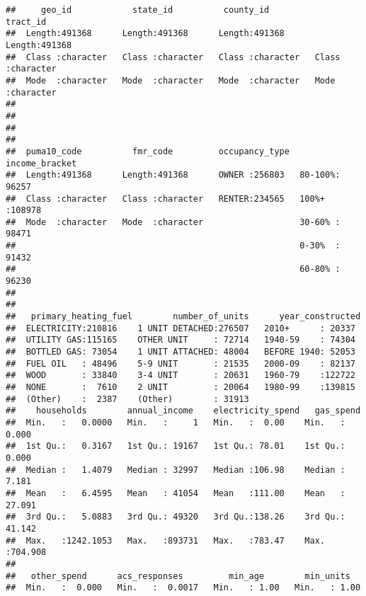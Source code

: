 \documentclass[]{article}
\begin{document}
\begin{verbatim}
##     geo_id            state_id          county_id           tract_id        
##  Length:491368      Length:491368      Length:491368      Length:491368     
##  Class :character   Class :character   Class :character   Class :character  
##  Mode  :character   Mode  :character   Mode  :character   Mode  :character  
##                                                                             
##                                                                             
##                                                                             
##                                                                             
##  puma10_code          fmr_code         occupancy_type  income_bracket  
##  Length:491368      Length:491368      OWNER :256803   80-100%: 96257  
##  Class :character   Class :character   RENTER:234565   100%+  :108978  
##  Mode  :character   Mode  :character                   30-60% : 98471  
##                                                        0-30%  : 91432  
##                                                        60-80% : 96230  
##                                                                        
##                                                                        
##   primary_heating_fuel        number_of_units      year_constructed 
##  ELECTRICITY:210816    1 UNIT DETACHED:276507   2010+      : 20337  
##  UTILITY GAS:115165    OTHER UNIT     : 72714   1940-59    : 74304  
##  BOTTLED GAS: 73054    1 UNIT ATTACHED: 48004   BEFORE 1940: 52053  
##  FUEL OIL   : 48496    5-9 UNIT       : 21535   2000-09    : 82137  
##  WOOD       : 33840    3-4 UNIT       : 20631   1960-79    :122722  
##  NONE       :  7610    2 UNIT         : 20064   1980-99    :139815  
##  (Other)    :  2387    (Other)        : 31913                       
##    households        annual_income    electricity_spend   gas_spend      
##  Min.   :   0.0000   Min.   :     1   Min.   :  0.00    Min.   :  0.000  
##  1st Qu.:   0.3167   1st Qu.: 19167   1st Qu.: 78.01    1st Qu.:  0.000  
##  Median :   1.4079   Median : 32997   Median :106.98    Median :  7.181  
##  Mean   :   6.4595   Mean   : 41054   Mean   :111.00    Mean   : 27.091  
##  3rd Qu.:   5.0883   3rd Qu.: 49320   3rd Qu.:138.26    3rd Qu.: 41.142  
##  Max.   :1242.1053   Max.   :893731   Max.   :783.47    Max.   :704.908  
##                                                                          
##   other_spend      acs_responses         min_age        min_units    
##  Min.   :  0.000   Min.   :  0.0017   Min.   : 1.00   Min.   : 1.00  

\end{verbatim}
\end{document}
